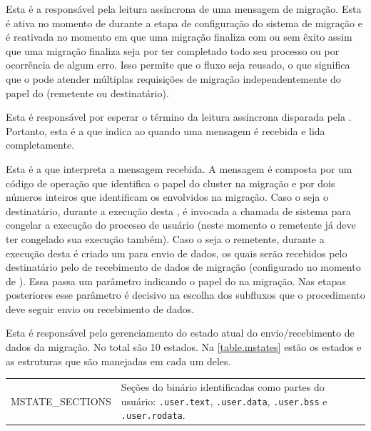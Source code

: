 \begin{description}[leftmargin=*,labelwidth=!,labelindent=0pt]
    \item[1.] Esta é a \task responsável pela leitura assíncrona de uma mensagem de migração. Esta \task é ativa no momento de \boot durante a etapa de configuração do sistema de migração e é reativada no momento em que uma migração finaliza com ou sem êxito \ie assim que uma migração finaliza seja por ter completado todo seu processo ou por ocorrência de algum erro. Isso permite que o fluxo seja reusado, o que significa que o \cluster pode atender múltiplas requisições de migração  independentemente do papel do \cluster (remetente ou destinatário).
    \item[2.] Esta \task é responsável por esperar o término da leitura assíncrona disparada pela . Portanto, esta é a \task que indica ao \daemon quando uma mensagem é recebida e lida completamente.
    \item[3.] Esta é a \task que interpreta a mensagem recebida. A mensagem é composta por um código de operação que identifica o papel do cluster na migração e por dois números inteiros que identificam os \clusters envolvidos na migração. Caso o \cluster seja o destinatário, durante a execução desta \task, é invocada a chamada de sistema \freeze para congelar a execução do processo de usuário (neste momento o \cluster remetente já deve ter congelado sua execução também). Caso o \cluster seja o remetente, durante a execução desta \task é criado um \portal para envio de dados, os quais serão recebidos pelo destinatário pelo \portal {} de recebimento de dados de migração (configurado no momento de \boot). Essa \task passa um parâmetro indicando o papel do \cluster na migração. Nas etapas posteriores esse parâmetro é decisivo na escolha dos subfluxos que o procedimento deve seguir \eg envio ou recebimento de dados.
    \item[4.] Esta \task é responsável pelo gerenciamento do estado atual do envio/recebimento de dados da migração. No total são 10 estados. Na \autoref{table.mstates} estão os estados e as estruturas que são manejadas em cada um deles.
    \begin{table}[tb]
        \centering
        \begin{tabular}{ | m{57mm} | m{80mm} | }
            \hline
                MSTATE\_SECTIONS & Seções do binário identificadas como partes do usuário: \texttt{.user.text}, \texttt{.user.data}, \texttt{.user.bss} e \texttt{.user.rodata}.  \\

\end{tabular}
\end{table}
\end{description}
